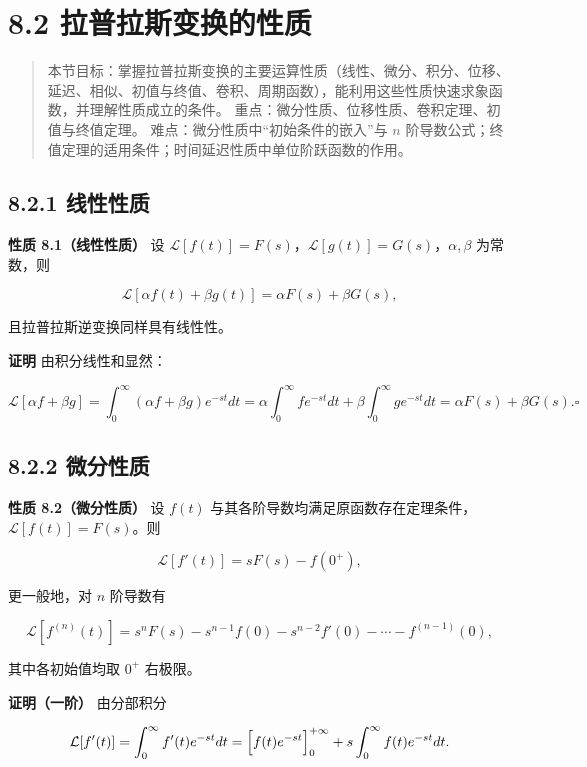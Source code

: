 \section{8.2
拉普拉斯变换的性质}\label{ux62c9ux666eux62c9ux65afux53d8ux6362ux7684ux6027ux8d28}

\begin{quote}
本节目标：掌握拉普拉斯变换的主要运算性质（线性、微分、积分、位移、延迟、相似、初值与终值、卷积、周期函数），能利用这些性质快速求象函数，并理解性质成立的条件。
重点：微分性质、位移性质、卷积定理、初值与终值定理。
难点：微分性质中``初始条件的嵌入''与 \(n\)
阶导数公式；终值定理的适用条件；时间延迟性质中单位阶跃函数的作用。
\end{quote}

\subsection{8.2.1 线性性质}\label{ux7ebfux6027ux6027ux8d28-1}

\textbf{性质 8.1（线性性质）} 设
\(\mathcal{L}[f(t)]=F(s)\)，\(\mathcal{L}[g(t)]=G(s)\)，\(\alpha,\beta\)
为常数，则

\[
\mathcal{L}[\alpha f(t)+\beta g(t)] = \alpha F(s)+\beta G(s),
\]

且拉普拉斯逆变换同样具有线性性。

\textbf{证明} 由积分线性和显然：

\[
\mathcal{L}[\alpha f+\beta g]=\int_0^{\infty}(\alpha f+\beta g)e^{-st}dt
=\alpha\int_0^{\infty}fe^{-st}dt+\beta\int_0^{\infty}ge^{-st}dt
=\alpha F(s)+\beta G(s). \square
\]

\subsection{8.2.2 微分性质}\label{ux5faeux5206ux6027ux8d28-1}

\textbf{性质 8.2（微分性质）} 设 \(f(t)\)
与其各阶导数均满足原函数存在定理条件，\(\mathcal{L}[f(t)]=F(s)\)。则

\[
\mathcal{L}[f'(t)] = sF(s)-f(0^+),
\]

更一般地，对 \(n\) 阶导数有

\[
\mathcal{L}[f^{(n)}(t)] = s^{n}F(s)-s^{n-1}f(0)-s^{n-2}f'(0)-\cdots-f^{(n-1)}(0),
\]

其中各初始值均取 \(0^+\) 右极限。

\textbf{证明（一阶）} 由分部积分

\[
\mathcal{L}[f'(t)]=\int_0^{\infty}f'(t)e^{-st}dt
=\Bigl[f(t)e^{-st}\Bigr]_0^{+\infty}+s\int_0^{\infty}f(t)e^{-st}dt .
\]

